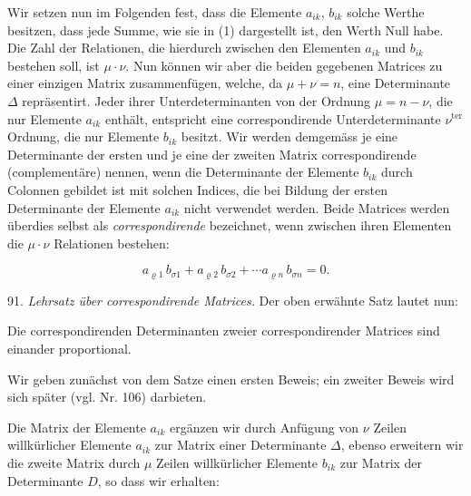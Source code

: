 Wir setzen nun im Folgenden fest, dass die Elemente $a_{ik}$, $b_{ik}$ solche Werthe besitzen, dass jede Summe, wie sie in (1) dargestellt ist, den Werth Null habe. Die Zahl der Relationen, die hierdurch zwischen den Elementen $a_{ik}$ und $b_{ik}$ bestehen soll, ist $\mu\cdot\nu$. Nun können wir aber die beiden gegebenen Matrices zu einer einzigen Matrix zusammenfügen, welche, da $\mu+\nu=n$, eine Determinante $\Delta$ repräsentirt. Jeder ihrer Unterdeterminanten von der Ordnung $\mu=n-\nu$, die nur Elemente $a_{ik}$ enthält, entspricht eine correspondirende Unterdeterminante $\nu^{\mathrm{ter}}$ Ordnung, die nur Elemente $b_{ik}$ besitzt. Wir werden demgemäss je eine Determinante der ersten und je eine der zweiten Matrix correspondirende (complementäre) nennen, wenn die Determinante der Elemente $b_{ik}$ durch Colonnen gebildet ist mit solchen Indices, die bei Bildung der ersten Determinante der Elemente $a_{ik}$ nicht verwendet werden. Beide Matrices werden überdies selbst als \textit{correspondirende} bezeichnet, wenn zwischen ihren Elementen die $\mu\cdot\nu$ Relationen bestehen:

\[
a_{\varrho 1}\, b_{\sigma 1} + a_{\varrho 2}\, b_{\sigma 2} + \cdots a_{\varrho n}\, b_{\sigma n} = 0.
\]

91. \textit{Lehrsatz über correspondirende Matrices.} Der oben erwähnte Satz lautet nun:

\glqq Die correspondirenden Determinanten zweier correspondirender Matrices sind einander proportional.\grqq{}

Wir geben zunächst von dem Satze einen ersten Beweis; ein zweiter Beweis wird sich später (vgl. Nr. 106) darbieten.

Die Matrix der Elemente $a_{ik}$ ergänzen wir durch Anfügung von $\nu$ Zeilen willkürlicher Elemente $a_{ik}$ zur Matrix einer Determinante $\Delta$, ebenso erweitern wir die zweite Matrix durch $\mu$ Zeilen willkürlicher Elemente $b_{ik}$ zur Matrix der Determinante $D$, so dass wir erhalten:

